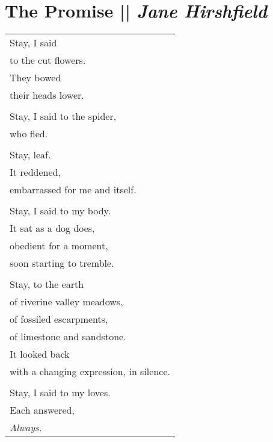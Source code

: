 \section[The Promise]{The Promise || \emph{Jane Hirshfield} \hspace*{\fill}  \thepage}
\vfill
\begin{center}
\begin{tabular}{l}
Stay, I said\\
to the cut flowers.\\
They bowed\\
their heads lower.\\
\\Stay, I said to the spider,\\
who fled.\\
\\Stay, leaf.\\
It reddened,\\
embarrassed for me and itself.\\
\\Stay, I said to my body.\\
It sat as a dog does,\\
obedient for a moment,\\
soon starting to tremble.\\
\\Stay, to the earth\\
of riverine valley meadows,\\
of fossiled escarpments,\\
of limestone and sandstone.\\
It looked back\\
with a changing expression, in silence.\\
\\Stay, I said to my loves.\\
Each answered,\\
\emph{Always.}
\end{tabular}
\end{center}
\vfill